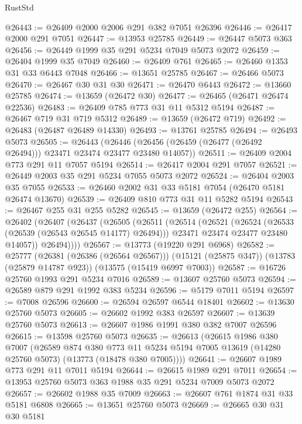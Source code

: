 \begin{lexlean}{RustStd}
\begin{coremodule}
@26443 := @26409 @2000 @2006 @291 @382 @7051 @26396
@26446 := @26417 @2000 @291 @7051
@26447 := @13953 @25785
@26449 := @26447 @5073 @363
@26456 := @26449 @1999 @35 @291 @5234 @7049 @5073 @2072
@26459 := @26404 @1999 @35 @7049
@26460 := @26409 @761
@26465 := @26460 @1353 @31 @33 @6443 @7048
@26466 := @13651 @25785
@26467 := @26466 @5073
@26470 := @26467 @30 @31 @30
@26471 := @26470 @6443
@26472 := @13660 @25785
@26474 := @13659 (@26472 @30)
@26477 := @26465 (@26471 @26474 @22536)
@26483 := @26409 @785 @773 @31 @11 @5312 @5194
@26487 := @26467 @719 @31 @719 @5312
@26489 := @13659 (@26472 @719)
@26492 := @26483 (@26487 @26489 @14330)
@26493 := @13761 @25785
@26494 := @26493 @5073
@26505 := @26443
    (@26446 (@26456 (@26459 (@26477 (@26492 @26494))) @23471 @23474 @23477 @23480 @14057))
@26511 := @26409 @2004 @773 @291 @11 @7057 @5194
@26514 := @26417 @2004 @291 @7057
@26521 := @26449 @2003 @35 @291 @5234 @7055 @5073 @2072
@26524 := @26404 @2003 @35 @7055
@26533 := @26460 @2002 @31 @33 @5181 @7054 (@26470 @5181 @26474 @13670)
@26539 := @26409 @810 @773 @31 @11 @5282 @5194
@26543 := @26467 @255 @31 @255 @5282
@26545 := @13659 (@26472 @255)
@26564 := @26402
    (@26407
      (@26437
        (@26505
          (@26511
            (@26514
              (@26521
                (@26524 (@26533 (@26539 (@26543 @26545 @14177) @26494)))
                @23471
                @23474
                @23477
                @23480
                @14057))
            @26494))))
@26567 := @13773 (@19220 @291 @6968)
@26582 := @25777
    (@26381 (@26386 (@26564 @26567)))
    (@15121 (@25875 @347))
    (@13783 (@25879 @14787 @923))
    (@13575 (@15419 @6997 @7003))
@26587 := @16726 @25760 @1993 @291 @5234 @7016
@26589 := @13607 @25760 @5073
@26594 := @26589 @879 @291 @1992 @383 @5234
@26596 := @5179 @7011 @5194
@26597 := @7008 @26596
@26600 := @26594 @26597 @6544 @18401
@26602 := @13630 @25760 @5073
@26605 := @26602 @1992 @383 @26597
@26607 := @13639 @25760 @5073
@26613 := @26607 @1986 @1991 @380 @382 @7007 @26596
@26615 := @13598 @25760 @5073
@26635 := @26613
    (@26615
      @1986
      @380
      @7007
      (@26589
        @874
        @380
        @773
        @11
        @5234
        @5194
        @7005
        @13619
        (@14280 @25760 @5073)
        (@13773 (@18478 @380 @7005))))
@26641 := @26607 @1989 @773 @291 @11 @7011 @5194
@26644 := @26615 @1989 @291 @7011
@26654 := @13953 @25760 @5073 @363 @1988 @35 @291 @5234 @7009 @5073 @2072
@26657 := @26602 @1988 @35 @7009
@26663 := @26607 @761 @1874 @31 @33 @5181 @6808
@26665 := @13651 @25760 @5073
@26669 := @26665 @30 @31 @30 @5181

\end{coremodule}
\end{lexlean}
